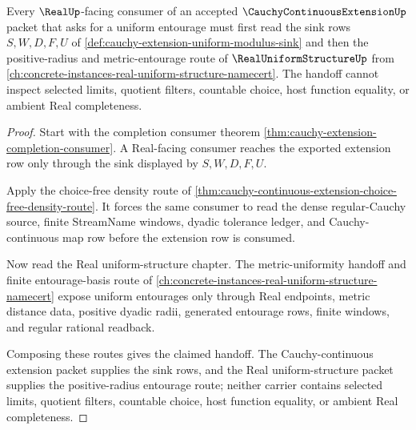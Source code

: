 \begin{theorem}
\label{thm:cauchy-continuous-extension-real-uniform-handoff}
Every $\RealUp$-facing consumer of an accepted $\CauchyContinuousExtensionUp$ packet that asks for a uniform entourage must first read the sink rows $S,W,D,F,U$ of \autoref{def:cauchy-extension-uniform-modulus-sink} and then the positive-radius and metric-entourage route of $\RealUniformStructureUp$ from \autoref{ch:concrete-instances-real-uniform-structure-namecert}. The handoff cannot inspect selected limits, quotient filters, countable choice, host function equality, or ambient Real completeness.
\end{theorem}
\begin{proof}
Start with the completion consumer theorem \autoref{thm:cauchy-extension-completion-consumer}. A Real-facing consumer reaches the exported extension row only through the sink displayed by $S,W,D,F,U$.

Apply the choice-free density route of \autoref{thm:cauchy-continuous-extension-choice-free-density-route}. It forces the same consumer to read the dense regular-Cauchy source, finite StreamName windows, dyadic tolerance ledger, and Cauchy-continuous map row before the extension row is consumed.

Now read the Real uniform-structure chapter. The metric-uniformity handoff and finite entourage-basis route of \autoref{ch:concrete-instances-real-uniform-structure-namecert} expose uniform entourages only through Real endpoints, metric distance data, positive dyadic radii, generated entourage rows, finite windows, and regular rational readback.

Composing these routes gives the claimed handoff. The Cauchy-continuous extension packet supplies the sink rows, and the Real uniform-structure packet supplies the positive-radius entourage route; neither carrier contains selected limits, quotient filters, countable choice, host function equality, or ambient Real completeness.
\end{proof}

